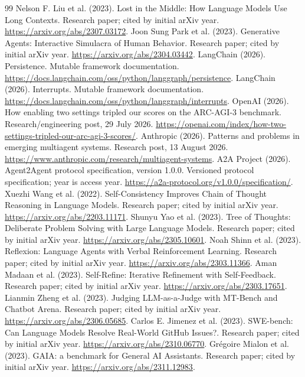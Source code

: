 \begin{thebibliography}{99}
Nelson F. Liu et al. (2023). Lost in the Middle: How Language Models Use Long Contexts. Research paper; cited by initial arXiv year. \url{https://arxiv.org/abs/2307.03172}.
Joon Sung Park et al. (2023). Generative Agents: Interactive Simulacra of Human Behavior. Research paper; cited by initial arXiv year. \url{https://arxiv.org/abs/2304.03442}.
LangChain (2026). Persistence. Mutable framework documentation. \url{https://docs.langchain.com/oss/python/langgraph/persistence}.
LangChain (2026). Interrupts. Mutable framework documentation. \url{https://docs.langchain.com/oss/python/langgraph/interrupts}.
OpenAI (2026). How enabling two settings tripled our scores on the ARC-AGI-3 benchmark. Research/engineering post, 29 July 2026. \url{https://openai.com/index/how-two-settings-tripled-our-arc-agi-3-scores/}.
Anthropic (2026). Patterns and problems in emerging multiagent systems. Research post, 13 August 2026. \url{https://www.anthropic.com/research/multiagent-systems}.
A2A Project (2026). Agent2Agent protocol specification, version 1.0.0. Versioned protocol specification; year is access year. \url{https://a2a-protocol.org/v1.0.0/specification/}.
Xuezhi Wang et al. (2022). Self-Consistency Improves Chain of Thought Reasoning in Language Models. Research paper; cited by initial arXiv year. \url{https://arxiv.org/abs/2203.11171}.
Shunyu Yao et al. (2023). Tree of Thoughts: Deliberate Problem Solving with Large Language Models. Research paper; cited by initial arXiv year. \url{https://arxiv.org/abs/2305.10601}.
Noah Shinn et al. (2023). Reflexion: Language Agents with Verbal Reinforcement Learning. Research paper; cited by initial arXiv year. \url{https://arxiv.org/abs/2303.11366}.
Aman Madaan et al. (2023). Self-Refine: Iterative Refinement with Self-Feedback. Research paper; cited by initial arXiv year. \url{https://arxiv.org/abs/2303.17651}.
Lianmin Zheng et al. (2023). Judging LLM-as-a-Judge with MT-Bench and Chatbot Arena. Research paper; cited by initial arXiv year. \url{https://arxiv.org/abs/2306.05685}.
Carlos E. Jimenez et al. (2023). SWE-bench: Can Language Models Resolve Real-World GitHub Issues?. Research paper; cited by initial arXiv year. \url{https://arxiv.org/abs/2310.06770}.
Grégoire Mialon et al. (2023). GAIA: a benchmark for General AI Assistants. Research paper; cited by initial arXiv year. \url{https://arxiv.org/abs/2311.12983}.

\end{thebibliography}
